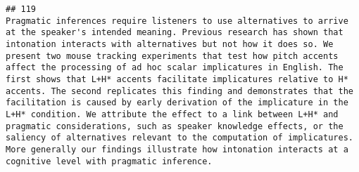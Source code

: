 \documentclass[
  english,
  man]{apa6}
\begin{document}
\begin{verbatim}
## 119                                                                                                                                                                                                                                                                                                                                                                                                                                                                                                                                                                                                                                                                                                                                                                                                                                                                                                                                                                                                                                                                                                                                                                                                                                                                                                                                                                                                                                                                                                                                                                                                                                                                                                                                                                            Pragmatic inferences require listeners to use alternatives to arrive at the speaker's intended meaning. Previous research has shown that intonation interacts with alternatives but not how it does so. We present two mouse tracking experiments that test how pitch accents affect the processing of ad hoc scalar implicatures in English. The first shows that L+H* accents facilitate implicatures relative to H* accents. The second replicates this finding and demonstrates that the facilitation is caused by early derivation of the implicature in the L+H* condition. We attribute the effect to a link between L+H* and pragmatic considerations, such as speaker knowledge effects, or the saliency of alternatives relevant to the computation of implicatures. More generally our findings illustrate how intonation interacts at a cognitive level with pragmatic inference.

\end{verbatim}
\end{document}
